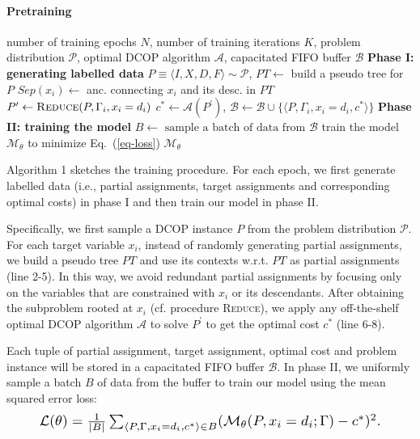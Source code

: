 \documentclass[letterpaper]{article} %
\begin{document}
\paragraph{Pretraining}
\begin{algorithm}[t]
\small
\caption{Offline pretraining procedure}\label{algo:train_c}
\begin{algorithmic}[1]
\Require number of training epochs $N$, number of training iterations $K$, problem distribution $\mathcal{P}$, optimal DCOP algorithm $\mathcal{A}$, capacitated FIFO buffer $\mathcal{B}$
\Statex \textbf{Phase I: generating labelled data}
\State $P\equiv\langle I,X,D,F\rangle\sim\mathcal{P}$, $PT\gets$ build a pseudo tree for $P$
\State $Sep(x_i)\gets $ anc. connecting $x_i$ and its desc. in $PT$
\State $P^\prime\gets\textsc{Reduce}(P,\Gamma_i,x_i=d_i)$
\State $c^*\gets \mathcal{A}(P^\prime)$, $\mathcal{B}\gets\mathcal{B}\cup\{\langle P,\Gamma_i,x_i=d_i,c^*\rangle\}$
\EndFor
\EndFor
\EndFor
\Statex \textbf{Phase II: training the model}
\State $B\gets\text{ sample a batch of data from }\mathcal{B}$
\State train the model $\mathcal{M}_\theta$ to minimize Eq.~(\ref{eq-loss})
\EndFor
\EndFor
\Return $\mathcal{M}_\theta$
\end{algorithmic}
\end{algorithm}
Algorithm 1 sketches the training procedure. For each epoch, we first generate labelled data (i.e., partial assignments, target assignments and corresponding optimal costs) in phase I and then train our model in phase II.

Specifically, we first sample a DCOP instance $P$ from the problem distribution $\mathcal{P}$. For each target variable $x_i$, instead of randomly generating partial assignments, we build a pseudo tree $PT$ and use its contexts w.r.t. $PT$ as partial assignments (line 2-5). In this way, we avoid redundant partial assignments by focusing only on the variables that are constrained with $x_i$ or its descendants. After obtaining the subproblem rooted at $x_i$ (cf. procedure \textsc{Reduce}), we apply any off-the-shelf optimal DCOP algorithm $\mathcal{A}$ to solve $P^\prime$ to get the optimal cost $c^*$ (line 6-8).

Each tuple of partial assignment, target assignment, optimal cost and problem instance will be stored in a capacitated FIFO buffer $\mathcal{B}$. %
In phase II, we uniformly sample a batch $B$ of data from the buffer to train our model using the mean squared error loss:
\begin{equation}
\resizebox{.9\hsize}{!}{
    $\mathcal{L}(\theta)=\frac{1}{|B|}\sum_{\langle P,\Gamma,x_i=d_i,c^*\rangle\in B}(\mathcal{M}_\theta(P,x_i=d_i;\Gamma)-c^*)^2.$
    }\label{eq-loss}
\end{equation}
\end{document}
